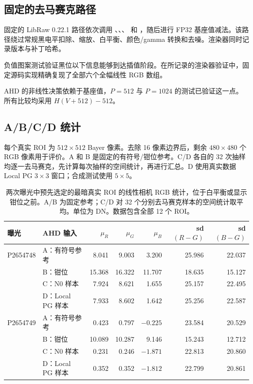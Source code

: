 \documentclass[10pt,twocolumn,journal]{IEEEtran}
\begin{document}
\subsection{固定的去马赛克路径}
固定的 LibRaw 0.22.1 路径依次调用 、、、 和 ，随后进行 FP32 基座值减法。该路径绕过常规黑电平扣除、缩放、白平衡、颜色/gamma 转换和去噪。渲染器同时记录版本与补丁哈希。

负值图案测试验证黑位以下信息能够到达插值阶段。在所记录的渲染器验证中，固定源码实现精确复现了全部六个全幅线性 RGB 数组。

AHD 的非线性决策依赖于基座值，$P=512$ 与 $P=1024$ 的测试已验证这一点。所有比较均采用 $H(V+512)-512$。

\subsection{A/B/C/D 统计}
每个真实 ROI 为 $512\times512$ Bayer 像素。去除 16 像素边界后，剩余 $480\times480$ 个 RGB 像素用于评价。A 和 B 是固定的有符号/钳位参考。C/D 各自的 32 次抽样均逐一去马赛克，先计算每次抽样的空间统计，再进行汇总。D 使用真实数据 Local PG $3\times3$ 窗口；合成测试使用 $5\times5$。

\begin{table}[t]
\centering
\caption{两次曝光中预先选定的最暗真实 ROI 的线性相机 RGB 统计，位于白平衡或显示钳位之前。A/B 为固定参考；C/D 对 32 个分别去马赛克样本的空间统计取平均。单位为 DN。数据包含全部 12 个 ROI。}
\label{tab:ahd}
\begin{tabular}{@{}llrrrrr@{}}
\toprule
曝光 & AHD 输入 & $\mu_R$ & $\mu_G$ & $\mu_B$ & sd$(R-G)$ & sd$(B-G)$\\
\midrule
P2654748 & A：有符号参考 & 8.041 & 9.003 & 3.200 & 25.986 & 22.037\\
& B：钳位 & 15.368 & 16.322 & 11.707 & 18.635 & 15.127\\
& C：N0 样本 & 7.924 & 8.621 & 1.655 & 25.157 & 22.495\\
& D：Local PG 样本 & 7.933 & 8.602 & 1.642 & 25.256 & 22.587\\
P2654749 & A：有符号参考 & 0.423 & 0.797 & $-0.225$ & 23.584 & 20.529\\
& B：钳位 & 10.089 & 10.287 & 9.146 & 15.243 & 12.712\\
& C：N0 样本 & 0.231 & 0.246 & $-1.871$ & 22.813 & 20.860\\
& D：Local PG 样本 & 0.352 & 0.352 & $-1.812$ & 22.799 & 20.861\\
\bottomrule
\end{tabular}
\end{table}
\end{document}
